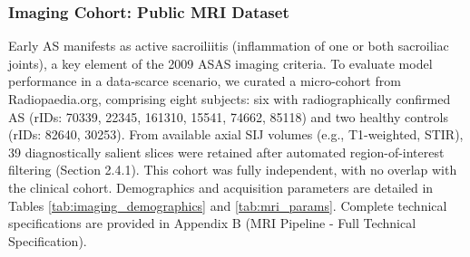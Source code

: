 \documentclass[12pt, a4paper]{article}
\begin{document}
\subsubsection{Imaging Cohort: Public MRI Dataset}
Early AS manifests as active sacroiliitis (inflammation of one or both sacroiliac joints), a key element of the 2009 ASAS imaging criteria. To evaluate model performance in a data-scarce scenario, we curated a micro-cohort from Radiopaedia.org, comprising eight subjects: six with radiographically confirmed AS (rIDs: 70339, 22345, 161310, 15541, 74662, 85118) and two healthy controls (rIDs: 82640, 30253). From available axial SIJ volumes (e.g., T1-weighted, STIR), 39 diagnostically salient slices were retained after automated region-of-interest filtering (Section 2.4.1). This cohort was fully independent, with no overlap with the clinical cohort. Demographics and acquisition parameters are detailed in Tables \ref{tab:imaging_demographics} and \ref{tab:mri_params}. Complete technical specifications are provided in Appendix B (MRI Pipeline - Full Technical Specification).

\begin{table}[H]
\centering
\small
\caption{Imaging Cohort Demographics}
\label{tab:imaging_demographics}
\end{table}



\begin{table}[H]
\centering
\small
\caption{MRI Acquisition Parameters}
\label{tab:mri_params}
\end{table}
\end{document}
